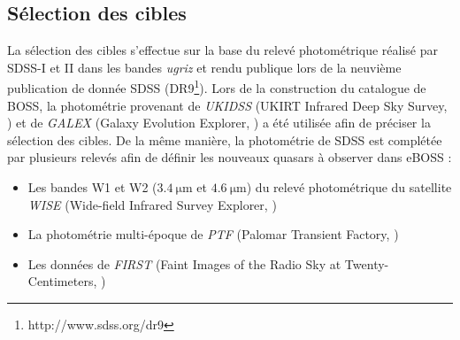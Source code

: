 \documentclass[11pt, twoside, a4paper, openright]{report}
\begin{document}
\subsection{Sélection des cibles}

La sélection des cibles s'effectue sur la base du relevé photométrique réalisé par SDSS-I et II dans les bandes \emph{ugriz} et rendu publique lors de la neuvième publication de donnée SDSS (DR9\footnote{http://www.sdss.org/dr9}).
Lors de la construction du catalogue de BOSS, la photométrie provenant de \emph{UKIDSS} (UKIRT Infrared Deep Sky Survey, \textcite{Lawrence2006}) et de \emph{GALEX} (Galaxy Evolution Explorer, \textcite{Martin2004}) a été utilisée afin de préciser la sélection des cibles.
De la même manière, la photométrie de SDSS est complétée par plusieurs relevés afin de définir les nouveaux quasars à observer dans eBOSS :
\begin{itemize}
\item Les bandes W1 et W2 ($\SI{3,4}{\micro\meter}$ et $\SI{4,6}{\micro\meter}$) du relevé photométrique du satellite \emph{WISE} (Wide-field Infrared Survey Explorer, \textcite{Wright2010})
\item La photométrie multi-époque de \emph{PTF} (Palomar Transient Factory, \textcite{Law2009})
\item Les données de \emph{FIRST} (Faint Images of the Radio Sky at Twenty-Centimeters, \textcite{Becker1995})
\end{itemize}


\end{document}
